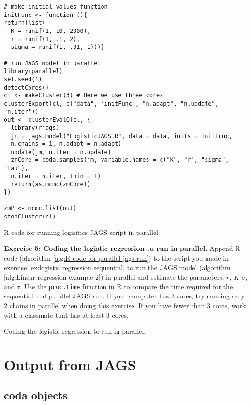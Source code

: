 \documentclass[12pt,english]{article}
\begin{document}
\begin{algorithm}
\begin{Verbatim}[frame=single]
# make initial values function
initFunc <- function (){
return(list(
  K = runif(1, 10, 2000),
  r = runif(1, .1, 2),
  sigma = runif(1, .01, 1)))}

# run JAGS model in parallel
library(parallel)
set.seed(1)
detectCores()
cl <- makeCluster(3) # Here we use three cores
clusterExport(cl, c("data", "initFunc", "n.adapt", "n.update", "n.iter")) 
out <- clusterEvalQ(cl, {
  library(rjags)
  jm = jags.model("LogisticJAGS.R", data = data, inits = initFunc, 
  n.chains = 1, n.adapt = n.adapt)
  update(jm, n.iter = n.update)
  zmCore = coda.samples(jm, variable.names = c("K", "r", "sigma", "tau"), 
  n.iter = n.iter, thin = 1)
  return(as.mcmc(zmCore))
}) 

zmP <- mcmc.list(out)
stopCluster(cl)
\end{Verbatim}
\caption{R code for running logisitics JAGS script in parallel}
\label{alg:R code for parallel jags run}
\end{algorithm}

\belowcaptionskip=-40pt
\begin{exercise}
\begin{mdframed}
\doublespacing
\textbf{Exercise 5: Coding the logistic regression to run in parallel.}  Append R code (algorithm \ref{alg:R code for parallel jags run}) to the script you made in exercise \ref{ex:logistic regression sequential} to run the JAGS model (algorithm \ref{alg:Linear regression example 2}) in parallel and estimate the parameters, $r$, $K$ $\sigma$, and $\tau$. Use the \texttt{proc.time} function in R to compare the time required for the sequential and parallel JAGS run. If your computer has 3 cores, try running only 2 chains in parallel when doing this exercise. If you have fewer than 3 cores, work with a classmate that has at least 3 cores.
\end{mdframed}
\captionsetup{textformat=empty, labelformat=empty}
\caption[Coding the logistic regression to run in parallel]{Coding the logistic regression to run in parallel.}
\label{ex:logistic regression parallel}
\end{exercise}
\belowcaptionskip=0pt

\section{Output from JAGS}

\subsection{coda objects}
\end{document}
